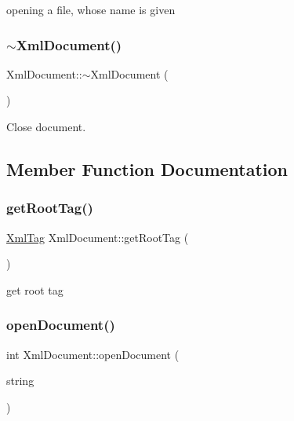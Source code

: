 opening a file, whose name is given \mbox{\label{classXmlDocument_ab18742228f580a5e4ec87e4b39c8a68c}} 
\subsubsection{\texorpdfstring{$\sim$\+Xml\+Document()}{~XmlDocument()}}
{\footnotesize\ttfamily Xml\+Document\+::$\sim$\+Xml\+Document (\begin{DoxyParamCaption}{ }\end{DoxyParamCaption})}

Close document. 

\subsection{Member Function Documentation}
\mbox{\label{classXmlDocument_a9c8b12f61097276eb79e31672fd30efe}} 
\subsubsection{\texorpdfstring{get\+Root\+Tag()}{getRootTag()}}
{\footnotesize\ttfamily \hyperlink{classXmlTag}{Xml\+Tag} Xml\+Document\+::get\+Root\+Tag (\begin{DoxyParamCaption}{ }\end{DoxyParamCaption})}

get root tag \mbox{\label{classXmlDocument_ae8f7f34abeaac2ba755a71b9d12ff7b6}} 
\subsubsection{\texorpdfstring{open\+Document()}{openDocument()}}
{\footnotesize\ttfamily int Xml\+Document\+::open\+Document (\begin{DoxyParamCaption}\item[{string}]{ }\end{DoxyParamCaption})}

